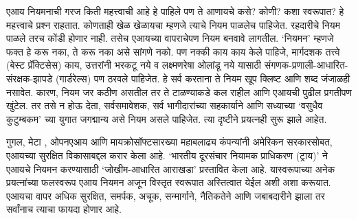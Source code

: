 एआय नियमनाची गरज किती महत्त्वाची आहे हे पाहिले पण ते आणायचे कसे? कोणी? कशा स्वरूपात? हे महत्त्वाचे  प्रश्न राहतात. कोणताही खेळ खेळायचा म्हणजे त्याचे नियम पाळलेच पाहिजेत. रहदारीचे नियम पाळले तरच कोंडी होणार नाही. तसेच एआयच्या वापराचेपण नियम बनवावे लागतील. `नियमन' म्हणजे फक्त हे करू नका, ते करू नका असे सांगणे नको. पण नक्की काय काय केले पाहिजे, मार्गदशक तत्त्वे  (बेस्ट प्रॅक्टिसेस) काय, उत्तरांनी भरकटू नये व लक्ष्मणरेषा ओलांडू नये यासाठी संगणक-प्रणाली-आधारित-संरक्षक-झापडे (गार्डरेल्स) पण ठरवले पाहिजेत. हे सर्व करताना ते नियम खूप क्लिष्ट आणि शब्द जंजाळही नसावेत. कारण, नियम जर कठीण असतील तर ते टाळण्याकडे कल राहील आणि एआयची पुढील प्रगतीपण खुंटेल. तर तसे न होऊ देता, सर्वसमावेशक, सर्व भागीदारांच्या सहकार्याने आणि सध्याच्या `वसुधैव कुटुम्बकम' च्या युगात जगद्मान्य असे नियम असले पाहिजेत. त्या दृष्टीने प्रयत्नही सुरू झाले आहेत.

गुगल, मेटा , ओपनएआय आणि मायक्रोसॉफ्टसारख्या महाबलाढ्य कंपन्यांनी अमेरिकन सरकारसोबत, एआयच्या सुरक्षित विकासाबद्दल करार केला आहे. `भारतीय दूरसंचार नियामक प्राधिकरण (ट्राय)' ने एआयचे नियमन करण्यासाठी `जोखीम-आधारित आराखडा' प्रस्तावित केला आहे. यास्वरूपाच्या अनेक प्रयत्नांच्या फलस्वरूप एआय नियमन अजून विस्तृत स्वरूपात अस्तित्वात येईल अशी अशा करूयात. एआयचा वापर अधिक सुरक्षित, समर्पक, अचूक, सन्मार्गाने, नैतिकतेने आणि जबाबदारीने झाला तर सर्वांनाच त्याचा फायदा होणार आहे.